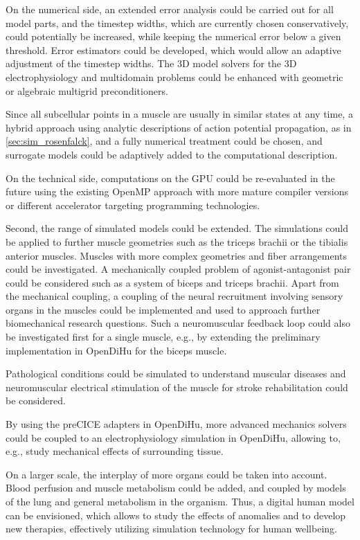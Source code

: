 On the numerical side, an extended error analysis could be carried out for all model parts, and the timestep widths, which are currently chosen conservatively, could potentially be increased, while keeping the numerical error below a given threshold. Error estimators could be developed, which would allow an adaptive adjustment of the timestep widths.
The 3D model solvers for the 3D electrophysiology and multidomain problems could be enhanced with geometric or algebraic multigrid preconditioners.

Since all subcellular points in a muscle are usually in similar states at any time, a hybrid approach using analytic descriptions of action potential propagation, as in \cref{sec:sim_rosenfalck}, and a fully numerical treatment could be chosen, and surrogate models could be adaptively added to the computational description.

On the technical side, computations on the GPU could be re-evaluated in the future using the existing OpenMP approach with more mature compiler versions or different accelerator targeting programming technologies.

Second, the range of simulated models could be extended. The simulations could be applied to further muscle geometries such as the triceps brachii or the tibialis anterior muscles. Muscles with more complex geometries and fiber arrangements could be investigated. 
A mechanically coupled problem of agonist-antagonist pair could be considered such as a system of biceps and triceps brachii. Apart from the mechanical coupling, a coupling of the neural recruitment involving sensory organs in the muscles could be implemented and used to approach further biomechanical research questions. Such a neuromuscular feedback loop could also be investigated first for a single muscle, e.g., by extending the preliminary implementation in OpenDiHu for the biceps muscle.

Pathological conditions could be simulated to understand muscular diseases and neuromuscular electrical stimulation of the muscle for stroke rehabilitation could be considered.

By using the preCICE adapters in OpenDiHu, more advanced mechanics solvers could be coupled to an electrophysiology simulation in OpenDiHu, allowing to, e.g., study mechanical effects of surrounding tissue.

On a larger scale, the interplay of more organs could be taken into account. Blood perfusion and muscle metabolism could be added, and coupled by models of the lung and general metabolism in the organism. Thus, a digital human model can be envisioned, which allows to study the effects of anomalies and to develop new therapies, effectively utilizing simulation technology for human wellbeing.

